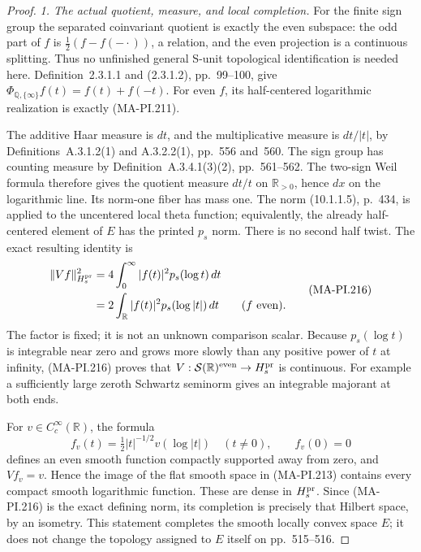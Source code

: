 \begin{proof}
\emph{1. The actual quotient, measure, and local completion.}
For the finite sign group the separated coinvariant quotient
is exactly the even subspace: the odd part of \(f\) is
\(\tfrac12(f-f(-\cdot))\), a relation, and the even projection
is a continuous splitting.  Thus no unfinished general
S-unit topological identification is needed here.
Definition~2.3.1.1 and (2.3.1.2), pp.~99--100, give
\(\Phi_{\mathbb Q,\{\infty\}}f(t)=f(t)+f(-t)\).
For even \(f\), its half-centered logarithmic realization
is exactly (MA-PI.211).

The additive Haar measure is \(dt\), and the multiplicative
measure is \(dt/|t|\), by Definitions~A.3.1.2(1) and
A.3.2.2(1), pp.~556 and~560.  The sign group has counting
measure by Definition~A.3.4.1(3)(2), pp.~561--562.
The two-sign Weil formula therefore gives the quotient
measure \(dt/t\) on \(\mathbb R_{>0}\), hence \(dx\) on
the logarithmic line.  Its norm-one fiber has mass one.
The norm (10.1.1.5), p.~434, is applied to the uncentered
local theta function; equivalently, the already half-centered
element of \(E\) has the printed \(p_s\) norm.  There is
no second half twist.  The exact resulting identity is
\[
 \begin{aligned}
 \|Vf\|_{H_s^{\rm pr}}^2
   &=4\int_0^\infty |f(t)|^2p_s(\log t)\,dt\\
   &=2\int_{\mathbb R}|f(t)|^2p_s(\log|t|)\,dt
                   \qquad(f\text{ even}).
 \end{aligned}
 \tag{MA-PI.216}
\]
The factor is fixed; it is not an unknown comparison scalar.
Because \(p_s(\log t)\) is integrable near zero and grows
more slowly than any positive power of \(t\) at infinity,
(MA-PI.216) proves that
\(V:\mathcal S(\mathbb R)^{\rm even}\to H_s^{\rm pr}\)
is continuous.  For example a sufficiently large zeroth
Schwartz seminorm gives an integrable majorant at both ends.

For \(v\in C_c^\infty(\mathbb R)\), the formula
\[
 f_v(t)=\tfrac12|t|^{-1/2}v(\log|t|)\quad(t\ne0),
                  \qquad f_v(0)=0
 \tag{MA-PI.217}
\]
defines an even smooth function compactly supported away
from zero, and \(Vf_v=v\).  Hence the image of the flat
smooth space in (MA-PI.213) contains every compact smooth
logarithmic function.  These are dense in \(H_s^{\rm pr}\).
Since (MA-PI.216) is the exact defining norm, its completion
is precisely that Hilbert space, by an isometry.
This statement completes the smooth locally convex space
\(E\); it does not change the topology assigned to \(E\)
itself on pp.~515--516.


\end{proof}
